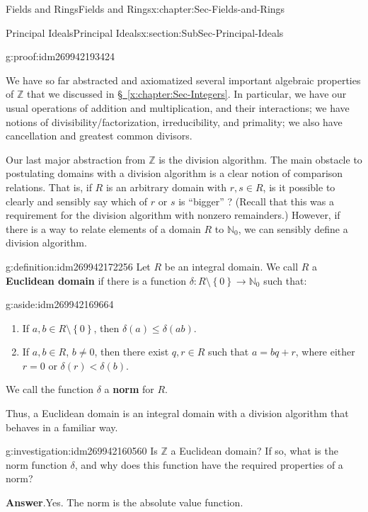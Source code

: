 \documentclass[oneside,10pt,]{book}
\newcommand{\terminology}[1]{\textbf{#1}}
\numberwithin{equation}{section}
\renewcommand{\le}{\leqslant}
\newcommand{\set}[1]{\left\{ {#1} \right\}}
\def\Z{{\mathbb Z}}
\def\N{{\mathbb N}}
\newcommand{\lt}{<}
\begin{document}
\begin{chapterptx}{Fields and Rings}{}{Fields and Rings}{}{}{x:chapter:Sec-Fields-and-Rings}
\begin{sectionptx}{Principal Ideals}{}{Principal Ideals}{}{}{x:section:SubSec-Principal-Ideals}
\begin{proofptx}{}{g:proof:idm269942193424}
\end{proofptx}
We have so far abstracted and axiomatized several important algebraic properties of \(\Z\) that we discussed in \hyperref[x:chapter:Sec-Integers]{§~\ref{x:chapter:Sec-Integers}}. In particular, we have our usual operations of addition and multiplication, and their interactions; we have notions of divisibility\slash{}factorization, irreducibility, and primality; we also have cancellation and greatest common divisors.%
\par
Our last major abstraction from \(\Z\) is the division algorithm. The main obstacle to postulating domains with a division algorithm is a clear notion of comparison relations. That is, if \(R\) is an arbitrary domain with \(r,s\in R\), is it possible to clearly and sensibly say which of \(r\) or \(s\) is ``bigger'' ? (Recall that this was a requirement for the division algorithm with nonzero remainders.) However, if there is a way to relate elements of a domain \(R\) to \(\N_0\), we can sensibly define a division algorithm.%
\begin{definition}{}{g:definition:idm269942172256}%
Let \(R\) be an integral domain. We call \(R\) a \terminology{Euclidean domain} if there is a function \(\delta : R\setminus \set{0} \to \N_0\) such that: \begin{aside}{}{g:aside:idm269942169664}%
\end{aside}
\textbraceright{}%
\begin{enumerate}
\item{}If \(a,b\in R\setminus \set{0}\), then \(\delta(a) \le \delta(ab)\).%
\item{}If \(a,b\in R\), \(b\ne 0\), then there exist \(q,r\in R\) such that \(a = bq+r\), where either \(r = 0\) or \(\delta(r) \lt \delta(b)\).%
\end{enumerate}
%
\par
We call the function \(\delta\) a \terminology{norm} for \(R\).%
\end{definition}
Thus, a Euclidean domain is an integral domain with a division algorithm that behaves in a familiar way.%
\begin{investigation}{}{g:investigation:idm269942160560}%
Is \(\Z\) a Euclidean domain? If so, what is the norm function \(\delta\), and why does this function have the required properties of a norm?%
\par\smallskip%
\noindent\textbf{Answer}.\hypertarget{g:answer:idm269942158480}{}\quad{}Yes. The norm is the absolute value function.%
\end{investigation}

\end{sectionptx}
\end{chapterptx}
\end{document}
